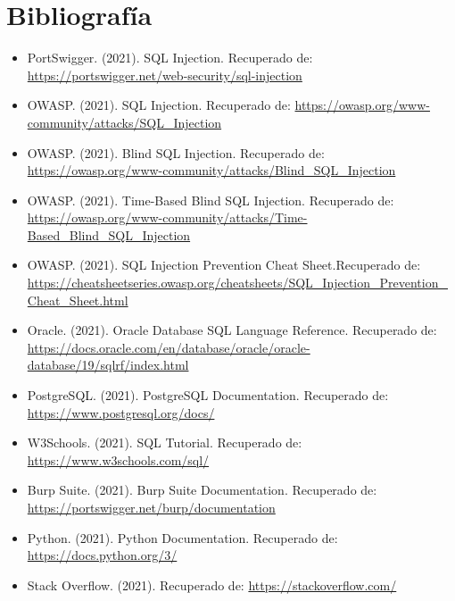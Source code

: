\documentclass[a4paper,12pt]{article}
\begin{document}
\section{Bibliografía}
\begin{small} %
\begin{itemize}
    \item PortSwigger. (2021). SQL Injection. Recuperado de: \url{https://portswigger.net/web-security/sql-injection}
    \item OWASP. (2021). SQL Injection. Recuperado de: \url{https://owasp.org/www-community/attacks/SQL_Injection}
    \item OWASP. (2021). Blind SQL Injection. Recuperado de: \url{https://owasp.org/www-community/attacks/Blind_SQL_Injection}
    \item OWASP. (2021). Time-Based Blind SQL Injection. Recuperado de: \url{https://owasp.org/www-community/attacks/Time-Based_Blind_SQL_Injection}
    \item OWASP. (2021). SQL Injection Prevention Cheat Sheet.Recuperado de: \url{https://cheatsheetseries.owasp.org/cheatsheets/SQL_Injection_Prevention_Cheat_Sheet.html}
    \item Oracle. (2021). Oracle Database SQL Language Reference. Recuperado de: \url{https://docs.oracle.com/en/database/oracle/oracle-database/19/sqlrf/index.html}
    \item PostgreSQL. (2021). PostgreSQL Documentation. Recuperado de: \url{https://www.postgresql.org/docs/}
    \item W3Schools. (2021). SQL Tutorial. Recuperado de: \url{https://www.w3schools.com/sql/}
    \item Burp Suite. (2021). Burp Suite Documentation. Recuperado de: \url{https://portswigger.net/burp/documentation}
    \item Python. (2021). Python Documentation. Recuperado de: \url{https://docs.python.org/3/}
    \item Stack Overflow. (2021). Recuperado de: \url{https://stackoverflow.com/}
\end{itemize}
\end{small}
\end{document}

